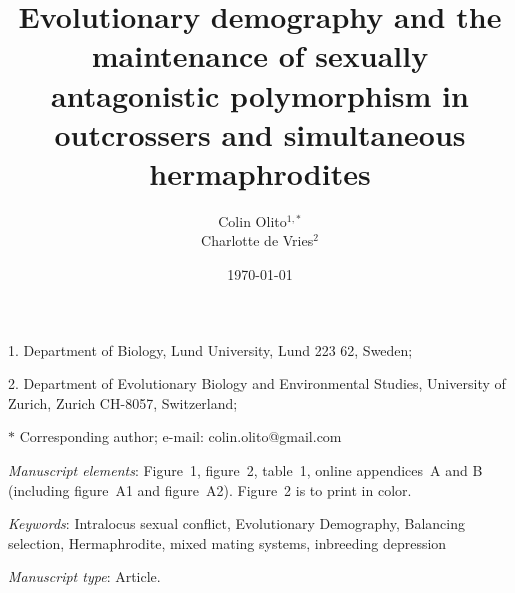 \documentclass[11pt]{article}
\begin{document}
\title{Evolutionary demography and the maintenance of sexually antagonistic polymorphism in outcrossers and simultaneous hermaphrodites}
\author{Colin Olito$^{1,\ast}$ \\ 
Charlotte de Vries$^{2}$}
\date{\today}
\maketitle

\noindent{} 1. Department of Biology, Lund University, Lund 223 62, Sweden;

\noindent{} 2.  Department of Evolutionary Biology and Environmental Studies, University of Zurich, Zurich CH-8057, Switzerland;

\noindent{} $\ast$ Corresponding author; e-mail: colin.olito@gmail.com

\bigskip

\textit{Manuscript elements}: Figure~1, figure~2, table~1, online appendices~A and B (including figure~A1 and figure~A2). Figure~2 is to print in color.

\bigskip

\textit{Keywords}: Intralocus sexual conflict, Evolutionary Demography, Balancing selection, Hermaphrodite, mixed mating systems, inbreeding depression 

\bigskip

\textit{Manuscript type}: Article. %

\bigskip


\linenumbers{}
\modulolinenumbers[3]

\newpage{}




\end{document}
